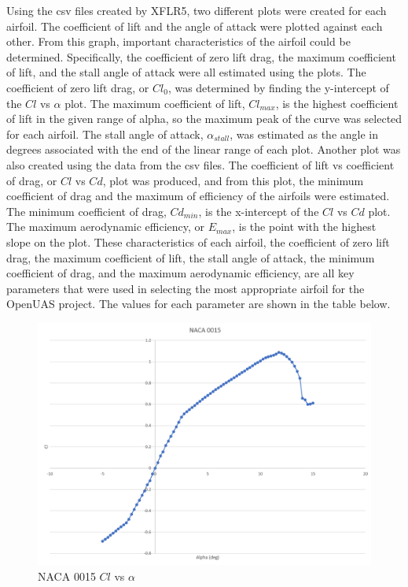 \documentclass{article}
\begin{document}
Using the csv files created by XFLR5, two different plots were created for each airfoil. The coefficient of lift and the angle of attack were plotted against each other. From this graph, important characteristics of the airfoil could be determined. Specifically, the coefficient of zero lift drag, the maximum coefficient of lift, and the stall angle of attack were all estimated using the plots. The coefficient of zero lift drag, or $Cl_{0}$, was determined by finding the y-intercept of the  $Cl$ vs $\alpha$ plot. The maximum coefficient of lift, $Cl_{max}$, is the highest coefficient of lift in the given range of alpha, so the maximum peak of the curve was selected for each airfoil. The stall angle of attack, $\alpha_{stall}$, was estimated as the angle in degrees associated with the end of the linear range of each plot. Another plot was also created using the data from the csv files. The coefficient of lift vs coefficient of drag, or $Cl$ vs $Cd$, plot was produced, and from this plot, the minimum coefficient of drag and the maximum of efficiency of the airfoils were estimated. The minimum coefficient of drag, $Cd_{min}$, is the x-intercept of the $Cl$ vs $Cd$ plot. The maximum aerodynamic efficiency, or $E_{max}$, is the point with the highest slope on the plot. These characteristics of each airfoil, the coefficient of zero lift drag, the maximum coefficient of lift, the stall angle of attack, the minimum coefficient of drag, and the maximum aerodynamic efficiency, are all key parameters that were used in selecting the most appropriate airfoil for the OpenUAS project. The values for each parameter are shown in the table below.\\

\begin{figure}
\begin{center}
	\includegraphics[scale=0.4]{NACA0015clvsalpha.png}
	\caption{NACA 0015 $Cl$ vs $\alpha$}
	\label{Figure 1:}

\end{center}
\end{figure}
\end{document}
